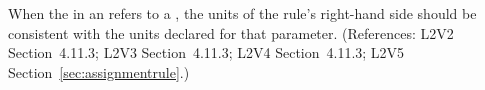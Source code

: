 When the  in an \AssignmentRule refers to a \Parameter, the
units of the rule's right-hand side should be consistent with the units
declared for that parameter.  (References: L2V2 Section~4.11.3;
L2V3 Section~4.11.3; L2V4 Section~4.11.3; L2V5 Section~\ref{sec:assignmentrule}.)
